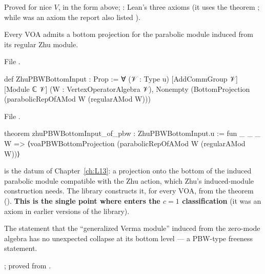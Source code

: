 \begin{status}
Proved for nice $V$, in the form above; : Lean's three axioms (it uses the theorem ; while  was an axiom the report also listed ).
\end{status}

\begin{definition}\label{l21:def:zhupbw}
Every VOA admits a bottom projection for the parabolic module induced from its regular Zhu module.
\end{definition}
\noindent File .
\begin{leancode}
def ZhuPBWBottomInput : Prop :=
  ∀ (𝒱 : Type u) [AddCommGroup 𝒱] [Module ℂ 𝒱] (W : VertexOperatorAlgebra 𝒱),
    Nonempty (BottomProjection (parabolicRepOfAMod W (regularAMod W)))
\end{leancode}
\noindent File .
\begin{leancode}
theorem zhuPBWBottomInput_of_pbw : ZhuPBWBottomInput.{u} :=
  fun _ _ _ W => ⟨voaPBWBottomProjection (parabolicRepOfAMod W (regularAMod W))⟩
\end{leancode}

\begin{dictionary}
 is the datum of Chapter~\ref{ch:L13}: a projection onto the bottom of the induced parabolic module
compatible with the Zhu action, which Zhu's induced-module construction needs. The library constructs it, for
every VOA, from the theorem  (). \textbf{This is the single point where
 enters the $c=1$ classification} (it was an axiom in earlier versions of the library).
\end{dictionary}

\begin{physics}
The statement that the ``generalized Verma module'' induced from the zero-mode algebra has no unexpected collapse at its
bottom level --- a PBW-type freeness statement.
\end{physics}

\begin{status}
; proved from .
\end{status}

